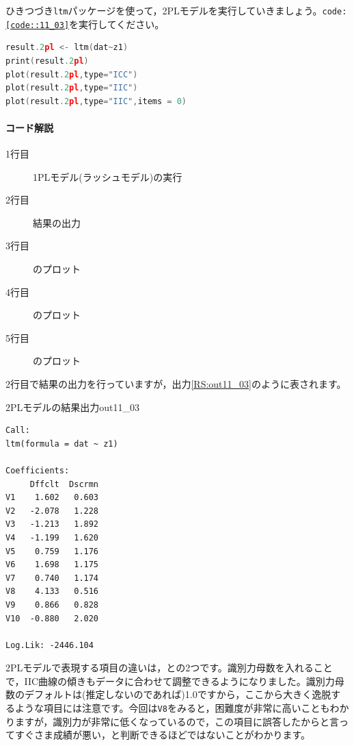 \documentclass{ltjsbook}
\begin{document}
ひきつづき\texttt{ltm}パッケージを使って，2PLモデルを実行していきましょう。\texttt{code:\ref{code::11_03}}を実行してください。

\begin{lstlisting}[language=c++,label={code::11_03},caption={2PLモデルの実行}]
result.2pl <- ltm(dat~z1)
print(result.2pl)
plot(result.2pl,type="ICC")
plot(result.2pl,type="IIC")
plot(result.2pl,type="IIC",items = 0)
\end{lstlisting}
        
\paragraph{コード解説}
\begin{description}
        \item[1行目] 1PLモデル(ラッシュモデル)の実行
        \item[2行目] 結果の出力
        \item[3行目] のプロット
        \item[4行目] のプロット
        \item[5行目] のプロット
\end{description}

2行目で結果の出力を行っていますが，出力\ref{RS:out11_03}のように表されます。
\begin{Rscreen}{2PLモデルの結果出力}{out11_03}
    \begin{verbatim}
Call:
ltm(formula = dat ~ z1)

Coefficients:
     Dffclt  Dscrmn
V1    1.602   0.603
V2   -2.078   1.228
V3   -1.213   1.892
V4   -1.199   1.620
V5    0.759   1.176
V6    1.698   1.175
V7    0.740   1.174
V8    4.133   0.516
V9    0.866   0.828
V10  -0.880   2.020

Log.Lik: -2446.104
    \end{verbatim}
\end{Rscreen}

2PLモデルで表現する項目の違いは，との2つです。識別力母数を入れることで，IIC曲線の傾きもデータに合わせて調整できるようになりました。識別力母数のデフォルトは(推定しないのであれば)1.0ですから，ここから大きく逸脱するような項目には注意です。今回は\texttt{V8}をみると，困難度が非常に高いこともわかりますが，識別力が非常に低くなっているので，この項目に誤答したからと言ってすぐさま成績が悪い，と判断できるほどではないことがわかります。
\end{document}
